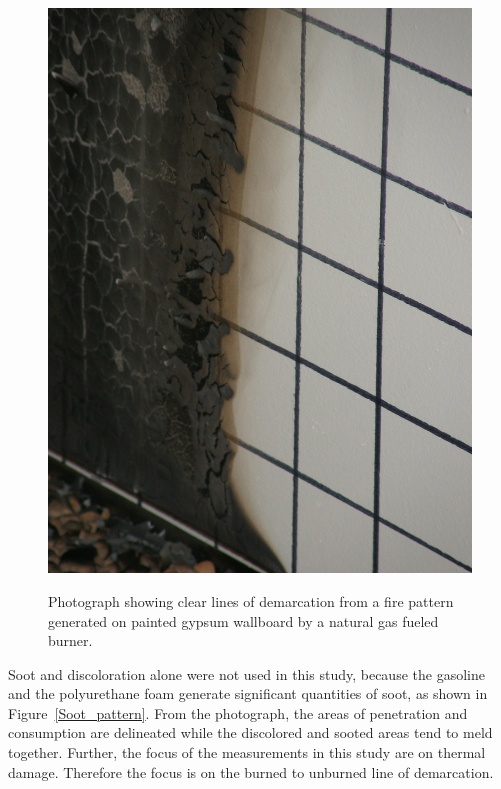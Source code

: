 \documentclass[twoside]{uocthesis}
\begin{document}
{\begin{figure}[p]
	\centering
	\includegraphics[width=\textwidth]{../Figures/demarcation}  \\
	\caption[Photograph showing clear lines of demarcation]{Photograph showing clear lines of demarcation from a fire pattern generated on painted gypsum wallboard by a natural gas fueled burner.}
	\label{demarcation}
\end{figure}

Soot and discoloration alone were not used in this study, because the gasoline and the polyurethane foam generate significant quantities of soot, as shown in Figure~\ref{Soot_pattern}.  From the photograph, the areas of penetration and consumption are delineated while the discolored and sooted areas tend to meld together.  Further, the focus of the measurements in this study are on thermal damage.  Therefore the focus is on the burned to unburned line of demarcation.

}
\end{document}
